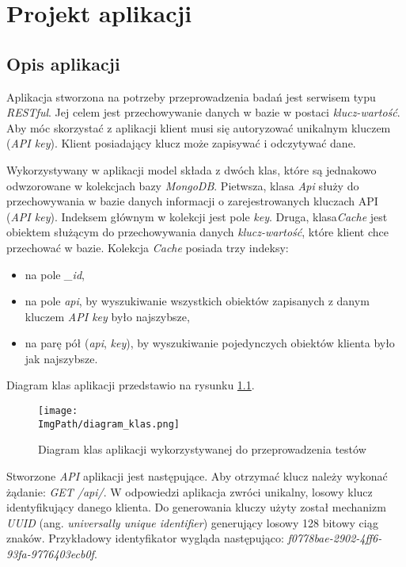 \chapter{Projekt aplikacji}
\section{Opis aplikacji}
Aplikacja stworzona na potrzeby przeprowadzenia badań jest serwisem typu \textsl{RESTful}. Jej celem jest przechowywanie danych w bazie w postaci \textsl{klucz-wartość}. Aby móc skorzystać z aplikacji klient musi się autoryzować unikalnym kluczem (\textsl{API key}). Klient posiadający klucz może zapisywać i odczytywać dane. 

 Wykorzystywany w aplikacji model składa z dwóch klas, które są jednakowo odwzorowane w kolekcjach bazy \textsl{MongoDB}. Pietwsza, klasa \textsl{Api} służy do przechowywania w bazie danych informacji o zarejestrowanych kluczach API (\textsl{API key}). Indeksem głównym w kolekcji jest pole \textsl{key}.
Druga, klasa\textsl{Cache} jest obiektem służącym do przechowywania danych \textsl{klucz-wartość}, które klient chce przechować w bazie.
Kolekcja \textsl{Cache} posiada trzy indeksy:\begin{itemize}
    \item na pole \textsl{\_id},
    \item na pole \textsl{api}, by wyszukiwanie wszystkich obiektów zapisanych z danym kluczem \textsl{API key} było najszybsze,
    \item na parę pół (\textsl{api}, \textsl{key}), by wyszukiwanie pojedynczych obiektów klienta było jak najszybsze.\end{itemize}
Diagram klas aplikacji przedstawio na  rysunku \ref{fig:class_diagram}. 
\begin{figure}[!ht]
\centering
\texttt{[image: \\ImgPath/diagram\_klas.png]}
\caption{Diagram klas aplikacji wykorzystywanej do przeprowadzenia testów}
\label{fig:class_diagram}
\end{figure}

Stworzone \textsl{API} aplikacji jest następujące. Aby otrzymać klucz należy wykonać żądanie: \textsl{GET /api/}. W odpowiedzi aplikacja zwróci unikalny, losowy klucz identyfikujący danego klienta. Do generowania kluczy użyty został mechanizm \textsl{UUID} (ang. \textsl{universally unique identifier}) generujący losowy 128 bitowy ciąg znaków. Przykładowy identyfikator wygląda następująco: \textsl{f0778bae-2902-4ff6-93fa-9776403ecb0f}.

